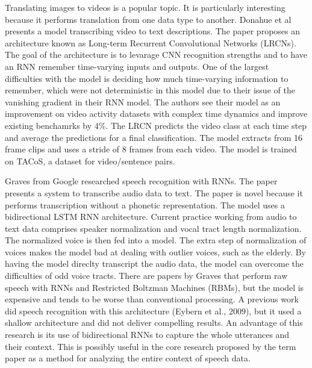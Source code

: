 Translating images to videos is a popular topic.  It is particularly interesting because it performs translation from one data type to another.  Donahue et al presents a model transcribing video to text descriptions.  The paper proposes an architecture known as Long-term Recurrent Convolutional Networks (LRCNs).  The goal of the architecture is to levarage CNN recognition strengths and to have an RNN remember time-varying inputs and outputs. One of the largest difficulties with the model is deciding how much time-varying information to remember, which were not deterministic in this model due to their issue of the vanishing gradient in their RNN model.  The authors see their model as an improvement on video activity datasets with complex time dynamics and improve existing benchamrks by 4\%.  The LRCN predicts the video class at each time step and average the predictions for a final classification.  The model extracts from 16 frame clips and uses a stride of 8 frames from each video.  The model is trained on TACoS, a dataset for video/sentence pairs.

Graves from Google researched speech recognition with RNNs.  The paper presents a system to transcribe audio data to text.  The paper is novel because it performs transcription without a phonetic representation.  The model uses a bidirectional LSTM RNN architecture.  Current practice working from audio to text data comprises speaker normalization and vocal tract length normalization.  The normalized voice is then fed into a model.  The extra step of normalization of voices makes the model bad at dealing with outlier voices, such as the elderly.  By having the model direclty transcript the audio data, the model can overcome the difficulties of odd voice tracts.  There are papers by Graves that perform raw speech with RNNs and Restricted Boltzman Machines (RBMs), but the model is expensive and tends to be worse than conventional processing.  A previous work did speech recognition with this architecture (Eybern et al., 2009), but it used a shallow architecture and did not deliver compelling results. An advantage of this research is its use of bidirectional RNNs to capture the whole utterances and their context.  This is possibly useful in the core research proposed by the term paper as a method for analyzing the entire context of speech data.










